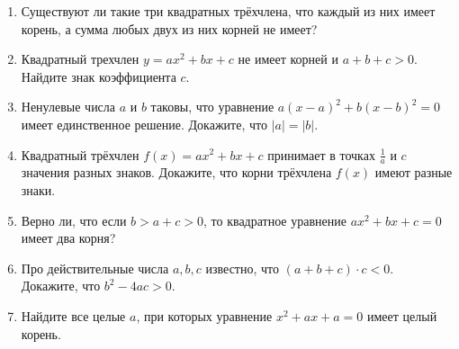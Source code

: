\documentclass{article}
\begin{document}
\begin{enumerate}[label*=\protect\fbox{\arabic{enumi}}]
\item Существуют ли такие три квадратных трёхчлена, что каждый из них имеет корень, а сумма любых двух из них корней не имеет?

\item Квадратный трехчлен  $y = ax^2 + bx + c$  не имеет корней и  $a  + b + c > 0$.  Найдите знак коэффициента $c$.

\item Ненулевые числа $a$ и $b$ таковы, что уравнение $a(x - a)^2 + b(x - b)^2 = 0$ имеет единственное решение. Докажите, что $|a| = |b|$.

\item Квадратный трёхчлен $f(x) = ax^2 + bx + c$ принимает в точках $\frac{1}{a}$ и $c$ значения разных знаков. Докажите, что корни трёхчлена $f(x)$ имеют разные знаки.

\item Верно ли, что если  $b > a + c > 0$,  то квадратное уравнение $ax^2 + bx + c = 0$ имеет два корня?

\item Про действительные числа $a, b, c$ известно, что $(a + b + c)\cdot c < 0$. Докажите, что $b^2 - 4ac>0$.

\item Найдите все целые $a$, при которых уравнение $x^2 + ax + a = 0$ имеет целый корень.


\end{enumerate}
\end{document}
